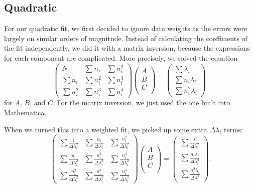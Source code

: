 \documentclass[12pt,twoside]{reedthesis}
\newcommand{\eqn}[1]{\begin{equation}#1\end{equation}}
\begin{document}
\subsection{Quadratic}
For our quadratic fit, we first decided to ignore data weights as the errors were largely on similar orders of magnitude.  Instead of calculating the coefficients of the fit independently, we did it with a matrix inversion, because the expressions for each component are complicated. More precisely, we solved the equation
\eqn{
\left(
\begin{array}{ccc}
N & \sum n_i &  \sum n_i^2 \\
\sum n_i & \sum n_i ^2 & \sum n_i^3 \\
\sum n_i ^2 & \sum n_i^3 & \sum n_i ^4
\end{array}
\right)
\left(
\begin{array}{c}
A \\
B \\
C \\
\end{array}
\right)
=
\left(
\begin{array}{c}
\sum \lambda_i \\
\sum n_i \lambda_i \\
\sum n_i^2 \lambda_i
\end{array}
\right)
\mbox{.}
}
for $A$, $B$, and $C$. For the matrix inversion, we just used the one built into Mathematica. 

When we turned this into a weighted fit, we picked up some extra $\Delta \lambda_i$ terms:
\eqn{
\left(
\begin{array}{ccc}
\sum \frac{1}{\Delta \lambda_i^2} & \sum \frac{n_i}{\Delta \lambda_i^2} &  \sum \frac{n_i^2}{\Delta \lambda_i^2} \\
\sum \frac{n_i}{\Delta \lambda_i^2} & \sum \frac{n_i ^2}{\Delta \lambda_i^2} & \sum \frac{n_i^3}{\Delta \lambda_i^2} \\
\sum \frac{n_i ^2}{\Delta \lambda_i^2} & \sum \frac{n_i^3}{\Delta \lambda_i^2} & \sum \frac{n_i ^4}{\Delta \lambda_i^2}
\end{array}
\right)
\left(
\begin{array}{c}
A \\
B \\
C \\
\end{array}
\right)
=
\left(
\begin{array}{c}
\sum \frac{\lambda_i}{\Delta \lambda_i^2} \\
\sum \frac{n_i \lambda_i}{\Delta \lambda_i^2} \\
\sum \frac{n_i^2 \lambda_i}{\Delta \lambda_i^2}
\end{array}
\right)
\mbox{.}
}
\end{document}
